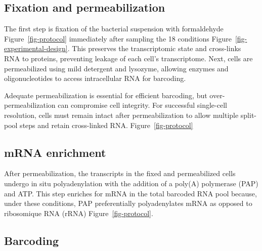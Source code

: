 \documentclass[
  11pt,
  a4paper,
]{report}
\begin{document}
\subsection{Fixation and
permeabilization}\label{fixation-and-permeabilization}

The first step is fixation of the bacterial suspension with formaldehyde
Figure~\ref{fig-protocol} immediately after sampling the 18 conditions
Figure~\ref{fig-experimental-design}. This preserves the transcriptomic
state and cross-links RNA to proteins, preventing leakage of each cell's
transcriptome. Next, cells are permeabilized using mild detergent and
lysozyme, allowing enzymes and oligonucleotides to access intracellular
RNA for barcoding.

\begin{tcolorbox}[enhanced jigsaw, arc=.35mm, colbacktitle=quarto-callout-note-color!10!white, rightrule=.15mm, title=\textcolor{quarto-callout-note-color}{\faInfo}\hspace{0.5em}{Note}, coltitle=black, bottomrule=.15mm, left=2mm, opacityback=0, colback=white, toprule=.15mm, toptitle=1mm, titlerule=0mm, breakable, bottomtitle=1mm, opacitybacktitle=0.6, colframe=quarto-callout-note-color-frame, leftrule=.75mm]

Adequate permeabilization is essential for efficient barcoding, but
over-permeabilization can compromise cell integrity. For successful
single-cell resolution, cells must remain intact after permeabilization
to allow multiple split-pool steps and retain cross-linked RNA.
Figure~\ref{fig-protocol}

\end{tcolorbox}

\subsection{mRNA enrichment}\label{mrna-enrichment}

After permeabilization, the transcripts in the fixed and permeabilized
cells undergo in situ polyadenylation with the addition of a poly(A)
polymerase (PAP) and ATP. This step enriches for mRNA in the total
barcoded RNA pool because, under these conditions, PAP preferentially
polyadenylates mRNA as opposed to ribosomique RNA (rRNA)
Figure~\ref{fig-protocol}.

\subsection{Barcoding}\label{barcoding}
\end{document}
